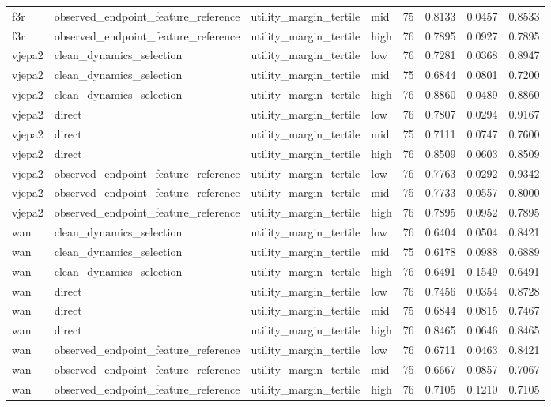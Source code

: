 \begin{tabular}{llllrrrr}
f3r & observed\_endpoint\_feature\_reference & utility\_margin\_tertile & mid & 75 & 0.8133 & 0.0457 & 0.8533 \\
f3r & observed\_endpoint\_feature\_reference & utility\_margin\_tertile & high & 76 & 0.7895 & 0.0927 & 0.7895 \\
vjepa2 & clean\_dynamics\_selection & utility\_margin\_tertile & low & 76 & 0.7281 & 0.0368 & 0.8947 \\
vjepa2 & clean\_dynamics\_selection & utility\_margin\_tertile & mid & 75 & 0.6844 & 0.0801 & 0.7200 \\
vjepa2 & clean\_dynamics\_selection & utility\_margin\_tertile & high & 76 & 0.8860 & 0.0489 & 0.8860 \\
vjepa2 & direct & utility\_margin\_tertile & low & 76 & 0.7807 & 0.0294 & 0.9167 \\
vjepa2 & direct & utility\_margin\_tertile & mid & 75 & 0.7111 & 0.0747 & 0.7600 \\
vjepa2 & direct & utility\_margin\_tertile & high & 76 & 0.8509 & 0.0603 & 0.8509 \\
vjepa2 & observed\_endpoint\_feature\_reference & utility\_margin\_tertile & low & 76 & 0.7763 & 0.0292 & 0.9342 \\
vjepa2 & observed\_endpoint\_feature\_reference & utility\_margin\_tertile & mid & 75 & 0.7733 & 0.0557 & 0.8000 \\
vjepa2 & observed\_endpoint\_feature\_reference & utility\_margin\_tertile & high & 76 & 0.7895 & 0.0952 & 0.7895 \\
wan & clean\_dynamics\_selection & utility\_margin\_tertile & low & 76 & 0.6404 & 0.0504 & 0.8421 \\
wan & clean\_dynamics\_selection & utility\_margin\_tertile & mid & 75 & 0.6178 & 0.0988 & 0.6889 \\
wan & clean\_dynamics\_selection & utility\_margin\_tertile & high & 76 & 0.6491 & 0.1549 & 0.6491 \\
wan & direct & utility\_margin\_tertile & low & 76 & 0.7456 & 0.0354 & 0.8728 \\
wan & direct & utility\_margin\_tertile & mid & 75 & 0.6844 & 0.0815 & 0.7467 \\
wan & direct & utility\_margin\_tertile & high & 76 & 0.8465 & 0.0646 & 0.8465 \\
wan & observed\_endpoint\_feature\_reference & utility\_margin\_tertile & low & 76 & 0.6711 & 0.0463 & 0.8421 \\
wan & observed\_endpoint\_feature\_reference & utility\_margin\_tertile & mid & 75 & 0.6667 & 0.0857 & 0.7067 \\
wan & observed\_endpoint\_feature\_reference & utility\_margin\_tertile & high & 76 & 0.7105 & 0.1210 & 0.7105 \\
\bottomrule
\end{tabular}
